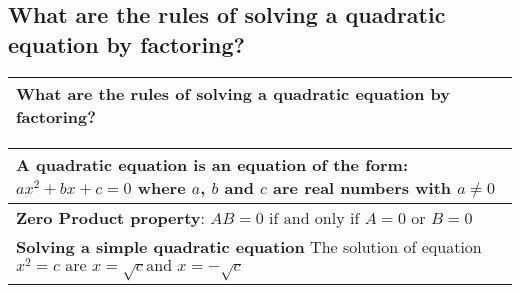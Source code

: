 \subsection{What are the rules of solving a quadratic equation by factoring?}
\begin{small}
    \begin{tabularx}{1\textwidth}{
            p{}
        }
        \toprule
            What are the rules of solving a quadratic equation by factoring?
        \\
        \bottomrule
    \end{tabularx}
\end{small}
\begin{small}
    \begin{tabularx}{1\textwidth}{
            p{}
        }
        \toprule
        \makecell{
            A \textbf{quadratic equation} is an equation of the form: \\ 
            $ ax^2 + bx + c = 0 $ \\
            where $a$, $b$ and $c$ are real numbers with $a \neq 0$
        }
        \\
        \midrule
        \makecell{
            \textbf{Zero Product property}: \\
            $ AB = 0 \text{ if and only if } A = 0 \text{ or } B = 0 $ \\
        }
        \\
        \midrule
        \makecell{
            \textbf{Solving a simple quadratic equation} \\
            The solution of equation $x^2 = c \text{ are } x = \sqrt{c} \text{
            and } x = -\sqrt{c} $ \\
        }
        \\
        \bottomrule
    \end{tabularx}
\end{small}

